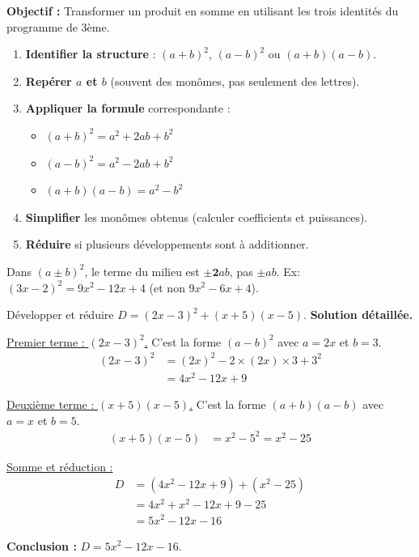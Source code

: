 \documentclass[11pt]{article}
\begin{document}
\begin{methode}
    \textbf{Objectif :} Transformer un produit en somme en utilisant les trois identités du programme de 3ème.
    \begin{enumerate}
        \item \textbf{Identifier la structure} : $(a+b)^2$, $(a-b)^2$ ou $(a+b)(a-b)$.
        \item \textbf{Repérer $a$ et $b$} (souvent des monômes, pas seulement des lettres).
        \item \textbf{Appliquer la formule} correspondante :
        \begin{itemize}
            \item $(a+b)^2 = a^2 + 2ab + b^2$
            \item $(a-b)^2 = a^2 - 2ab + b^2$
            \item $(a+b)(a-b) = a^2 - b^2$
        \end{itemize}
        \item \textbf{Simplifier} les monômes obtenus (calculer coefficients et puissances).
        \item \textbf{Réduire} si plusieurs développements sont à additionner.
    \end{enumerate}
    \begin{attention} Dans $(a \pm b)^2$, le terme du milieu est $\pm \mathbf{2}ab$, pas $\pm ab$. Ex: $(3x-2)^2 = 9x^2 - 12x + 4$ (et non $9x^2 - 6x + 4$).
    \end{attention}
\end{methode}

\begin{exoresolu}
Développer et réduire $D = (2x - 3)^2 + (x+5)(x-5)$.
\tcblower
\textbf{Solution détaillée.}

\underline{Premier terme : $(2x - 3)^2$.}
C'est la forme $(a-b)^2$ avec $a = 2x$ et $b = 3$.
\begin{align*}
(2x - 3)^2 &= (2x)^2 - 2 \times (2x) \times 3 + 3^2 \\
           &= 4x^2 - 12x + 9
\end{align*}

\underline{Deuxième terme : $(x+5)(x-5)$.}
C'est la forme $(a+b)(a-b)$ avec $a = x$ et $b = 5$.
\begin{align*}
(x+5)(x-5) &= x^2 - 5^2 = x^2 - 25
\end{align*}

\underline{Somme et réduction :}
\begin{align*}
D &= (4x^2 - 12x + 9) + (x^2 - 25) \\
  &= 4x^2 + x^2 - 12x + 9 - 25 \\
  &= 5x^2 - 12x - 16
\end{align*}

\textbf{Conclusion :} $D = 5x^2 - 12x - 16$.
\end{exoresolu}
\end{document}
